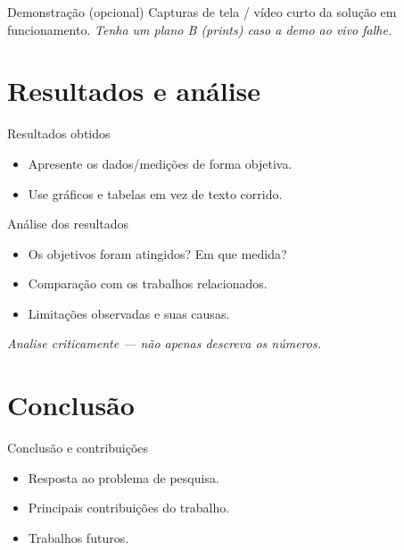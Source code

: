 \documentclass[
    aspectratio=169,
    12pt,
    brazil
]{beamer}
\begin{document}
\begin{frame}{Demonstração (opcional)}
  \centering
  \vspace{1cm}
  {\Large Capturas de tela / vídeo curto da solução em funcionamento.}
  \vfill
  {\footnotesize\itshape Tenha um plano B (prints) caso a demo ao vivo falhe.}
\end{frame}

\section{Resultados e análise}
\begin{frame}{Resultados obtidos}
  \begin{itemize}
    \item Apresente os dados/medições de forma objetiva.
    \item Use gráficos e tabelas em vez de texto corrido.
  \end{itemize}
\end{frame}

\begin{frame}{Análise dos resultados}
  \begin{itemize}
    \item Os objetivos foram atingidos? Em que medida?
    \item Comparação com os trabalhos relacionados.
    \item Limitações observadas e suas causas.
  \end{itemize}
  \vfill
  {\footnotesize\itshape Analise criticamente --- não apenas descreva os números.}
\end{frame}

\section{Conclusão}
\begin{frame}{Conclusão e contribuições}
  \begin{itemize}
    \item Resposta ao problema de pesquisa.
    \item Principais contribuições do trabalho.
    \item Trabalhos futuros.
  \end{itemize}
\end{frame}
\end{document}
